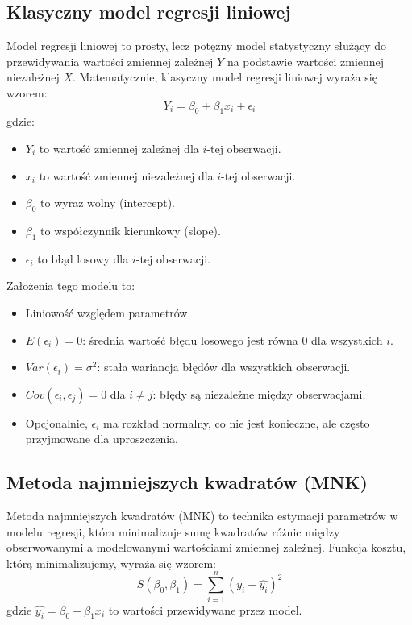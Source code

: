 \documentclass{article}
\begin{document}
\subsection{Klasyczny model regresji liniowej}
Model regresji liniowej to prosty, lecz potężny model statystyczny służący do przewidywania wartości zmiennej zależnej \(Y\) na podstawie wartości zmiennej niezależnej \(X\). Matematycznie, klasyczny model regresji liniowej wyraża się wzorem:
\[ Y_i = \beta_0 + \beta_1x_i + \epsilon_i \]
gdzie:
\begin{itemize}
    \item \(Y_i\) to wartość zmiennej zależnej dla \(i\)-tej obserwacji.
    \item \(x_i\) to wartość zmiennej niezależnej dla \(i\)-tej obserwacji.
    \item \(\beta_0\) to wyraz wolny (intercept).
    \item \(\beta_1\) to współczynnik kierunkowy (slope).
    \item \(\epsilon_i\) to błąd losowy dla \(i\)-tej obserwacji.
\end{itemize}
Założenia tego modelu to:
\begin{itemize}
    \item Liniowość względem parametrów.
    \item \(E(\epsilon_i) = 0\): średnia wartość błędu losowego jest równa 0 dla wszystkich \(i\).
    \item \(Var(\epsilon_i) = \sigma^2\): stała wariancja błędów dla wszystkich obserwacji.
    \item \(Cov(\epsilon_i, \epsilon_j) = 0\) dla \(i \neq j\): błędy są niezależne między obserwacjami.
    \item Opcjonalnie, \(\epsilon_i\) ma rozkład normalny, co nie jest konieczne, ale często przyjmowane dla uproszczenia.
\end{itemize}

\subsection{Metoda najmniejszych kwadratów (MNK)}
Metoda najmniejszych kwadratów (MNK) to technika estymacji parametrów w modelu regresji, która minimalizuje sumę kwadratów różnic między obserwowanymi a modelowanymi wartościami zmiennej zależnej. Funkcja kosztu, którą minimalizujemy, wyraża się wzorem:
\[ S(\beta_0, \beta_1) = \sum_{i=1}^{n} (y_i - \hat{y_i})^2 \]
gdzie \( \hat{y_i} = \beta_0 + \beta_1x_i \) to wartości przewidywane przez model.
\end{document}

